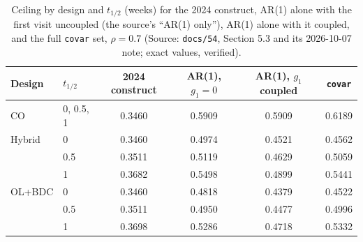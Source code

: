 \documentclass[11pt]{article}
\newcommand{\code}[1]{\texttt{#1}}
\begin{document}
\begin{table}[h]
\centering\small
\caption{Ceiling by design and $t_{1/2}$ (weeks) for the 2024 construct,
AR(1) alone with the first visit uncoupled (the source's ``AR(1)
only''), AR(1) alone with it coupled, and the full \code{covar} set,
$\rho = 0.7$ (Source: \code{docs/54}, Section
5.3 and its 2026-10-07 note; exact values, verified).}
\label{tab:invd-decomp-design}
\begin{tabular}{@{}llcccc@{}}
\toprule
Design & $t_{1/2}$ & 2024 construct & AR(1), $g_1 = 0$ & AR(1), $g_1$
coupled & \code{covar} \\
\midrule
CO     & 0, 0.5, 1 & 0.3460 & 0.5909 & 0.5909 & 0.6189 \\
Hybrid & 0   & 0.3460 & 0.4974 & 0.4521 & 0.4562 \\
       & 0.5 & 0.3511 & 0.5119 & 0.4629 & 0.5059 \\
       & 1   & 0.3682 & 0.5498 & 0.4899 & 0.5441 \\
OL+BDC & 0   & 0.3460 & 0.4818 & 0.4379 & 0.4522 \\
       & 0.5 & 0.3511 & 0.4950 & 0.4477 & 0.4996 \\
       & 1   & 0.3698 & 0.5286 & 0.4718 & 0.5332 \\
\bottomrule
\end{tabular}
\end{table}
\end{document}
